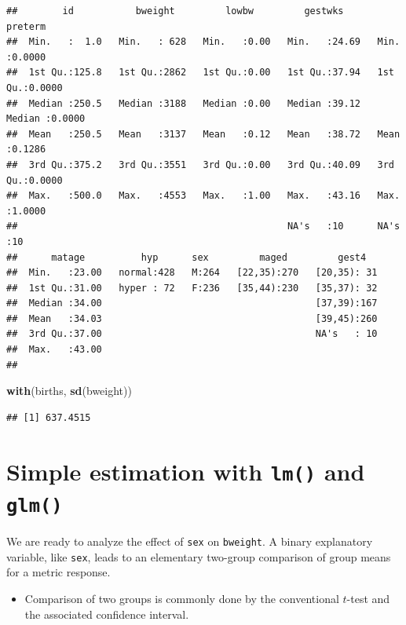 \documentclass[
]{book}
\newenvironment{Shaded}{\begin{snugshade}}{\end{snugshade}}
\newcommand{\FunctionTok}[1]{\textcolor[rgb]{0.13,0.29,0.53}{\textbf{#1}}}
\newcommand{\NormalTok}[1]{#1}
\providecommand{\tightlist}{%
  \setlength{\itemsep}{0pt}\setlength{\parskip}{0pt}}
\begin{document}
\begin{verbatim}
##        id           bweight         lowbw         gestwks         preterm      
##  Min.   :  1.0   Min.   : 628   Min.   :0.00   Min.   :24.69   Min.   :0.0000  
##  1st Qu.:125.8   1st Qu.:2862   1st Qu.:0.00   1st Qu.:37.94   1st Qu.:0.0000  
##  Median :250.5   Median :3188   Median :0.00   Median :39.12   Median :0.0000  
##  Mean   :250.5   Mean   :3137   Mean   :0.12   Mean   :38.72   Mean   :0.1286  
##  3rd Qu.:375.2   3rd Qu.:3551   3rd Qu.:0.00   3rd Qu.:40.09   3rd Qu.:0.0000  
##  Max.   :500.0   Max.   :4553   Max.   :1.00   Max.   :43.16   Max.   :1.0000  
##                                                NA's   :10      NA's   :10      
##      matage          hyp      sex         maged         gest4    
##  Min.   :23.00   normal:428   M:264   [22,35):270   [20,35): 31  
##  1st Qu.:31.00   hyper : 72   F:236   [35,44):230   [35,37): 32  
##  Median :34.00                                      [37,39):167  
##  Mean   :34.03                                      [39,45):260  
##  3rd Qu.:37.00                                      NA's   : 10  
##  Max.   :43.00                                                   
## 
\end{verbatim}

\begin{Shaded}
\begin{Highlighting}[]
\FunctionTok{with}\NormalTok{(births, }\FunctionTok{sd}\NormalTok{(bweight))}
\end{Highlighting}
\end{Shaded}

\begin{verbatim}
## [1] 637.4515
\end{verbatim}

\section{\texorpdfstring{Simple estimation with \texttt{lm()} and \texttt{glm()}}{Simple estimation with lm() and glm()}}\label{simple-estimation-with-lm-and-glm}

We are ready to analyze the effect of \texttt{sex} on \texttt{bweight}.
A binary explanatory variable, like \texttt{sex}, leads to an elementary
two-group comparison of group
means for a metric response.

\begin{itemize}
\tightlist
\item
  Comparison of two groups is commonly done by the conventional \(t\)-test and
  the associated confidence interval.
\end{itemize}
\end{document}
